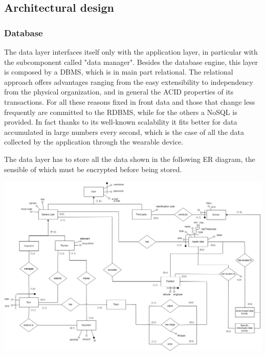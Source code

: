 \subsection{Architectural design}
\subsubsection{Database}
The data layer interfaces itself only with the application layer, in particular with the subcomponent called "data manager". Besides the database engine, this layer is composed by a DBMS, which is in main part relational. The relational approach offers advantages ranging from the easy extensibility to independency from the physical organization, and in general the ACID properties of its transactions. For all these reasons fixed in front data and those that change less frequently are committed to the RDBMS, while for the others a NoSQL is provided. In fact thanks to its well-known scalability it fits better for data accumulated in large numbers every second, which is the case of all the data collected by the application through the wearable device.

The data layer has to store all the data shown in the following ER diagram, the sensible of which must be encrypted before being stored.

\begin{center}
\includegraphics[scale=0.35]{sections/diagrams/ER.png}
\end{center}